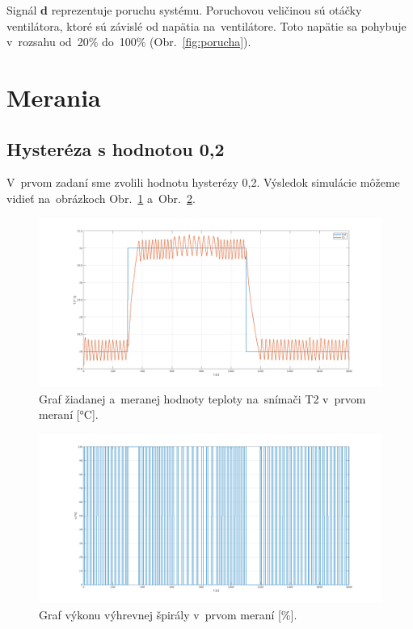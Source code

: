 \documentclass{article}
\begin{document}
Signál \textbf{d} reprezentuje poruchu systému. Poruchovou veličinou sú otáčky ventilátora, ktoré sú závislé
od napätia na~ventilátore. Toto napätie sa pohybuje v~rozsahu od~20\% do~100\% (Obr.~\ref{fig:porucha}).

\section{Merania}
\label{sec:merania}

\subsection{Hysteréza s hodnotou 0,2}
\label{sec:meranie1}

V~prvom zadaní sme zvolili hodnotu hysterézy 0,2. Výsledok simulácie môžeme vidieť na~obrázkoch
Obr.~\ref{fig:m1t2} a~Obr.~\ref{fig:m1u}.

\begin{figure}[!htbp]
	\begin{center}
		\includegraphics[width=\textwidth]{./include/m1T2.png}
	\end{center}
	\caption{Graf žiadanej a~meranej hodnoty teploty na~snímači T2 v~prvom meraní [°C].}
	\label{fig:m1t2}
\end{figure}

\clearpage

\begin{figure}[!htbp]
	\begin{center}
		\includegraphics[width=\textwidth]{./include/m1u.png}
	\end{center}
	\caption{Graf výkonu výhrevnej špirály v~prvom meraní [\%].}
	\label{fig:m1u}
\end{figure}
\end{document}
